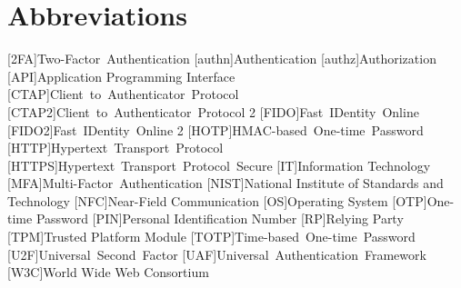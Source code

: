\documentclass[twoside,twocolumn]{article}
\title{\mytitle} %
\author{%
  \textsc{Nils Siegle} \\[1ex] %
  \normalsize 3087271 \\ %
  \normalsize \href{mailto:nils.siegle@stud.uni-due.de}{nils.siegle@stud.uni-due.de} %
}
\date{\today} %
\begin{document}
\maketitle

\newpage
\onecolumn
\tableofcontents
\newpage


\section*{Abbreviations}
\begin{acronym}[AAAAAAA]
  [2FA]{Two-Factor Authentication}
  [authn]{Authentication}
  [authz]{Authorization}
  [API]{Application Programming Interface}
  [CTAP]{Client to Authenticator Protocol}
  [CTAP2]{Client to Authenticator Protocol 2}
  [FIDO]{Fast IDentity Online}
  [FIDO2]{Fast IDentity Online 2}
  [HOTP]{HMAC-based One-time Password}
  [HTTP]{Hypertext Transport Protocol}
  [HTTPS]{Hypertext Transport Protocol Secure}
  [IT]{Information Technology}
  [MFA]{Multi-Factor Authentication}
  [NIST]{National Institute of Standards and Technology}
  [NFC]{Near-Field Communication}
  [OS]{Operating System}
  [OTP]{One-time Password}
  [PIN]{Personal Identification Number}
  [RP]{Relying Party}
  [TPM]{Trusted Platform Module}
  [TOTP]{Time-based One-time Password}
  [U2F]{Universal Second Factor}
  [UAF]{Universal Authentication Framework}
  [W3C]{World Wide Web Consortium}
\end{acronym}


\newpage
\twocolumn



\end{document}
